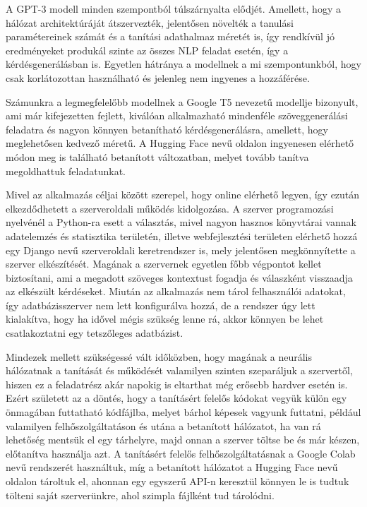 A GPT-3 modell minden szempontból túlszárnyalta elődjét. Amellett, hogy a hálózat architektúráját átszervezték, jelentősen növelték a tanulási paramétereinek számát és a tanítási adathalmaz méretét is, így rendkívül jó eredményeket produkál szinte az összes NLP feladat esetén, így a kérdésgenerálásban is. Egyetlen hátránya a modellnek a mi szempontunkból, hogy csak korlátozottan használható és jelenleg nem ingyenes a hozzáférése.

Számunkra a legmegfelelőbb modellnek a Google T5 nevezetű modellje bizonyult, ami már kifejezetten fejlett, kiválóan alkalmazható mindenféle szöveggenerálási feladatra és nagyon könnyen betanítható kérdésgenerálásra, amellett, hogy meglehetősen kedvező méretű. A Hugging Face nevű oldalon ingyenesen elérhető módon meg is található betanított változatban, melyet tovább tanítva megoldhattuk feladatunkat.

Mivel az alkalmazás céljai között szerepel, hogy online elérhető legyen, így ezután elkezdődhetett a szerveroldali működés kidolgozása. A szerver programozási nyelvénél a Python-ra esett a választás, mivel nagyon hasznos könyvtárai vannak adatelemzés és statisztika területén, illetve webfejlesztési területen elérhető hozzá egy Django nevű szerveroldali keretrendszer is, mely jelentősen megkönnyítette a szerver elkészítését. Magának a szervernek egyetlen főbb végpontot kellet biztosítani, ami a megadott szöveges kontextust fogadja és válaszként visszaadja az elkészült kérdéseket. Miután az alkalmazás nem tárol felhasználói adatokat, így adatbázisszerver nem lett konfigurálva hozzá, de a rendszer úgy lett kialakítva, hogy ha idővel mégis szükség lenne rá, akkor könnyen be lehet csatlakoztatni egy tetszőleges adatbázist. 

Mindezek mellett szükségessé vált időközben, hogy magának a neurális hálózatnak a tanítását és működését valamilyen szinten szeparáljuk a szervertől, hiszen ez a feladatrész akár napokig is eltarthat még erősebb hardver esetén is. Ezért született az a döntés, hogy a tanításért felelős kódokat vegyük külön egy önmagában futtatható kódfájlba, melyet bárhol képesek vagyunk futtatni, például valamilyen felhőszolgáltatáson és utána a betanított hálózatot, ha van rá lehetőség mentsük el egy tárhelyre, majd onnan a szerver töltse be és már készen, előtanítva használja azt. A tanításért felelős felhőszolgáltatásnak a Google Colab nevű rendszerét használtuk, míg a betanított hálózatot a Hugging Face nevű oldalon tároltuk el, ahonnan egy egyszerű API-n keresztül könnyen le is tudtuk tölteni saját szerverünkre, ahol szimpla fájlként tud tárolódni.

